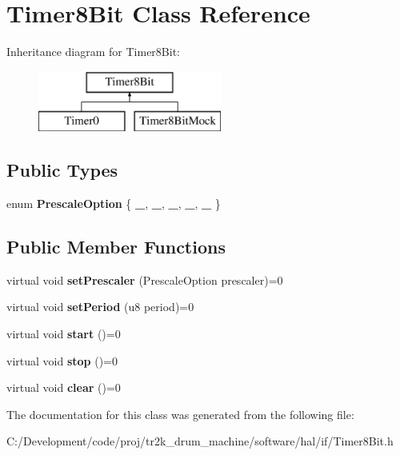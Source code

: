 \hypertarget{class_timer8_bit}{}\section{Timer8\+Bit Class Reference}
\label{class_timer8_bit}
Inheritance diagram for Timer8\+Bit\+:\begin{figure}[H]
\begin{center}
\leavevmode
\includegraphics[height=2.000000cm]{class_timer8_bit}
\end{center}
\end{figure}
\subsection*{Public Types}
\begin{DoxyCompactItemize}
\item 
\mbox{\label{class_timer8_bit_a6ce4007894d75d11e1c42272ce02e300}} 
enum {\bfseries Prescale\+Option} \{ \newline
{\bfseries \+\_}, 
{\bfseries \+\_}, 
{\bfseries \+\_}, 
{\bfseries \+\_}, 
\newline
{\bfseries \+\_}
 \}
\end{DoxyCompactItemize}
\subsection*{Public Member Functions}
\begin{DoxyCompactItemize}
\item 
\mbox{\label{class_timer8_bit_a25936cc143d3a691c6b4af8e8101fb2e}} 
virtual void {\bfseries set\+Prescaler} (Prescale\+Option prescaler)=0
\item 
\mbox{\label{class_timer8_bit_ab180e7c393b4ba33a689de92e6ca3405}} 
virtual void {\bfseries set\+Period} (u8 period)=0
\item 
\mbox{\label{class_timer8_bit_adb347e6c1160be1766cd73c6c8940515}} 
virtual void {\bfseries start} ()=0
\item 
\mbox{\label{class_timer8_bit_a85d81aff44c77f38282172a6f89986ce}} 
virtual void {\bfseries stop} ()=0
\item 
\mbox{\label{class_timer8_bit_a0889614f99eb7ee2470e822ef58ca83d}} 
virtual void {\bfseries clear} ()=0
\end{DoxyCompactItemize}


The documentation for this class was generated from the following file\+:\begin{DoxyCompactItemize}
\item 
C\+:/\+Development/code/proj/tr2k\+\_\+drum\+\_\+machine/software/hal/if/Timer8\+Bit.\+h\end{DoxyCompactItemize}
